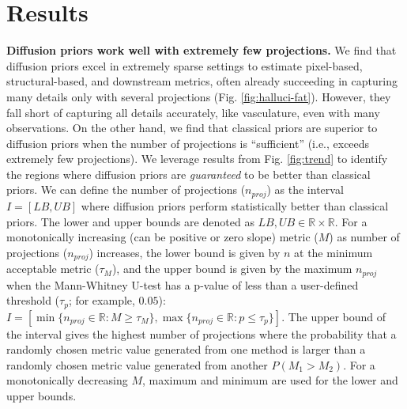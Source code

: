 \section{Results}

\noindent\textbf{Diffusion priors work well with extremely few projections. }
We find that diffusion priors excel in extremely sparse settings to estimate pixel-based, structural-based, and downstream metrics, often already succeeding in capturing many details only with several projections (Fig. \ref{fig:halluci-fat}).
However, they fall short of capturing all details accurately, like vasculature, even with many observations.
On the other hand, we find that classical priors are superior to diffusion priors when the number of projections is ``sufficient'' (i.e., exceeds extremely few projections).
We leverage results from Fig. \ref{fig:trend} to identify the regions where diffusion priors are \textit{guaranteed} to be better than classical priors. 
We can define the number of projections ($n_{proj}$) as the interval $I=[LB,UB]$ where diffusion priors perform statistically better than classical priors.
The lower and upper bounds are denoted as $LB,UB\in\mathbb{R}\times\mathbb{R}$.
For a monotonically increasing (can be positive or zero slope) metric ($M$) as number of projections ($n_{proj}$) increases, the lower bound is given by $n$ at the minimum acceptable metric ($\tau_M$), and the upper bound is given by the maximum $n_{proj}$ when the Mann-Whitney U-test has a p-value of less than a user-defined threshold ($\tau_p$; for example, $0.05$): $I=[\min \{n_{proj}\in\mathbb{R}: M\geq\tau_M\}, \max\{n_{proj}\in\mathbb{R}:p\leq\tau_p\}]$.
The upper bound of the interval gives the highest number of projections where the probability that a randomly chosen metric value generated from one method is larger than a randomly chosen metric value generated from another $P(M_1>M_2)$.
For a monotonically decreasing $M$, maximum and minimum are used for the lower and upper bounds.
